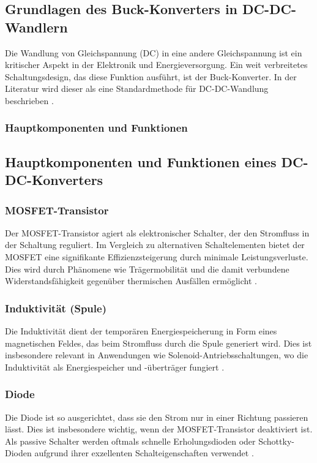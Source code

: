 \subsection{Grundlagen des Buck-Konverters in DC-DC-Wandlern}

Die Wandlung von Gleichspannung (DC) in eine andere Gleichspannung ist ein kritischer Aspekt in der Elektronik und Energieversorgung. Ein weit verbreitetes Schaltungsdesign, das diese Funktion ausführt, ist der Buck-Konverter. In der Literatur wird dieser als eine Standardmethode für DC-DC-Wandlung beschrieben \cite[p.~66]{wensdesign2022}.

\subsubsection{Hauptkomponenten und Funktionen}

\subsection{Hauptkomponenten und Funktionen eines DC-DC-Konverters}

\subsubsection{MOSFET-Transistor}
Der MOSFET-Transistor agiert als elektronischer Schalter, der den Stromfluss in der Schaltung reguliert. Im Vergleich zu alternativen Schaltelementen bietet der MOSFET eine signifikante Effizienzsteigerung durch minimale Leistungsverluste. Dies wird durch Phänomene wie Trägermobilität und die damit verbundene Widerstandsfähigkeit gegenüber thermischen Ausfällen ermöglicht \cite[p.~29]{choi2013pulsewidth}.

\subsubsection{Induktivität (Spule)}
Die Induktivität dient der temporären Energiespeicherung in Form eines magnetischen Feldes, das beim Stromfluss durch die Spule generiert wird. Dies ist insbesondere relevant in Anwendungen wie Solenoid-Antriebsschaltungen, wo die Induktivität als Energiespeicher und -überträger fungiert \cite[p.~54]{choi2013pulsewidth}.

\subsubsection{Diode}
Die Diode ist so ausgerichtet, dass sie den Strom nur in einer Richtung passieren lässt. Dies ist insbesondere wichtig, wenn der MOSFET-Transistor deaktiviert ist. Als passive Schalter werden oftmals schnelle Erholungsdioden oder Schottky-Dioden aufgrund ihrer exzellenten Schalteigenschaften verwendet \cite[p.~29]{choi2013pulsewidth}.


